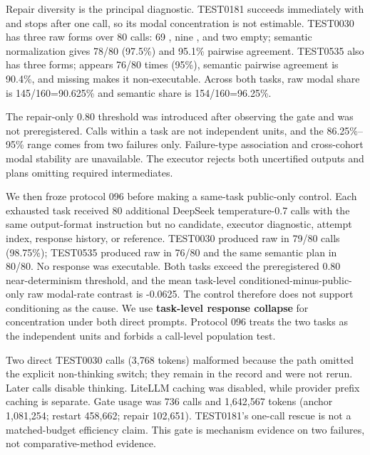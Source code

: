Repair diversity is the principal diagnostic. TEST0181 succeeds immediately with \texttt{} and stops after one call, so its modal concentration is not estimable. TEST0030 has three raw forms over 80 calls: 69 \texttt{\detokenize{["IMPOSSIBLE"]}}, nine \texttt{}, and two empty; semantic normalization gives 78/80 (97.5\%) and 95.1\% pairwise agreement. TEST0535 also has three forms; \texttt{} appears 76/80 times (95\%), semantic pairwise agreement is 90.4\%, and missing \texttt{} makes it non-executable. Across both tasks, raw modal share is 145/160=90.625\% and semantic share is 154/160=96.25\%.

The repair-only 0.80 threshold was introduced after observing the gate and was not preregistered. Calls within a task are not independent units, and the 86.25\%--95\% range comes from two failures only. Failure-type association and cross-cohort modal stability are unavailable. The executor rejects both uncertified \texttt{} outputs and plans omitting required intermediates.

We then froze protocol 096 before making a same-task public-only control. Each exhausted task received 80 additional DeepSeek temperature-0.7 calls with the same output-format instruction but no candidate, executor diagnostic, attempt index, response history, or reference. TEST0030 produced raw \texttt{\detokenize{["bookshelf"]}} in 79/80 calls (98.75\%); TEST0535 produced raw \texttt{} in 76/80 and the same semantic plan in 80/80. No response was executable. Both tasks exceed the preregistered 0.80 near-determinism threshold, and the mean task-level conditioned-minus-public-only raw modal-rate contrast is -0.0625. The control therefore does not support conditioning as the cause. We use \textbf{task-level response collapse} for concentration under both direct prompts. Protocol 096 treats the two tasks as the independent units and forbids a call-level population test.

Two direct TEST0030 calls (3,768 tokens) malformed because the path omitted the explicit non-thinking switch; they remain in the record and were not rerun. Later calls disable thinking. LiteLLM caching was disabled, while provider prefix caching is separate. Gate usage was 736 calls and 1,642,567 tokens (anchor 1,081,254; restart 458,662; repair 102,651). TEST0181's one-call rescue is not a matched-budget efficiency claim. This gate is mechanism evidence on two failures, not comparative-method evidence.

